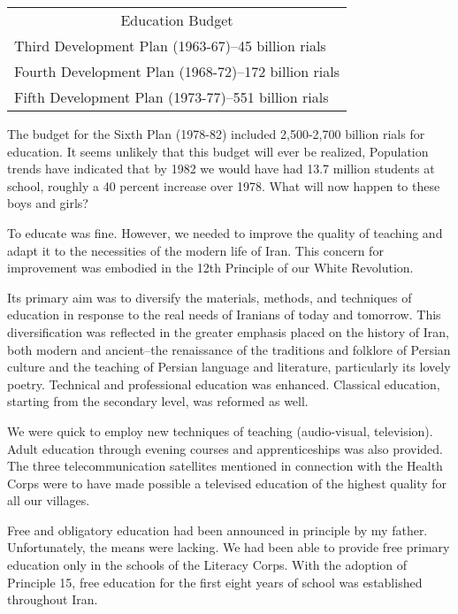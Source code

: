 \begin{center}
    \begin{tabular}{l}
    \multicolumn{1}{c}{Education Budget} \\
    Third Development Plan (1963-67)--45 billion rials \\
    Fourth Development Plan (1968-72)--172 billion rials \\
    Fifth Development Plan (1973-77)--551 billion rials \\
    \end{tabular}%
    \end{center}


The budget for the Sixth Plan (1978-82) included 2,500-2,700 billion rials for education. It seems unlikely that this budget will ever be realized, Population trends have indicated that by 1982 we would have had 13.7 million students at school, roughly a 40 percent increase over 1978. What will now happen to these boys and girls? 

To educate was fine. However, we needed to improve the quality of teaching and adapt it to the necessities of the modern life of Iran. This concern for improvement was embodied in the 12th Principle of our White Revolution. 

Its primary aim was to diversify the materials, methods, and techniques of education in response to the real needs of Iranians of today and tomorrow. This diversification was reflected in the greater emphasis placed on the history of Iran, both modern and ancient--the renaissance of the traditions and folklore of Persian culture and the teaching of Persian language and literature, particularly its lovely poetry. Technical and professional education was enhanced. Classical education, starting from the secondary level, was reformed as well. 

We were quick to employ new techniques of teaching (audio-visual, television). Adult education through evening courses and apprenticeships was also provided. The three telecommunication satellites mentioned in connection with the Health Corps were to have made possible a televised education of the highest quality for all our villages. 

Free and obligatory education had been announced in principle by my father. Unfortunately, the means were lacking. We had been able to provide free primary education only in the schools of the Literacy Corps. With the adoption of Principle 15, free education for the first eight years of school was established throughout Iran. 

